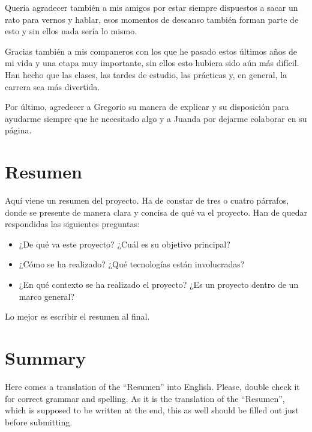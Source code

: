 \documentclass[a4paper, 12pt]{book}
\begin{document}
Quería agradecer también a mis amigos por estar siempre dispuestos a sacar un rato para vernos y hablar, esos momentos de descanso también forman parte de esto y sin ellos nada sería lo mismo.

Gracias también a mis companeros con los que he pasado estos últimos años de mi vida y una etapa muy importante, sin ellos esto hubiera sido aún más difícil. Han hecho que las clases, las tardes de estudio, las prácticas y, en general, la carrera sea más divertida.

Por último, agredecer a Gregorio su manera de explicar y su disposición para ayudarme siempre que he necesitado algo y a Juanda por dejarme colaborar en su página.



\chapter*{Resumen}

Aquí viene un resumen del proyecto.
Ha de constar de tres o cuatro párrafos, donde se presente de manera clara y concisa de qué va el proyecto. 
Han de quedar respondidas las siguientes preguntas:

\begin{itemize}
  \item ¿De qué va este proyecto? ¿Cuál es su objetivo principal?
  \item ¿Cómo se ha realizado? ¿Qué tecnologías están involucradas?
  \item ¿En qué contexto se ha realizado el proyecto? ¿Es un proyecto dentro de un marco general?
\end{itemize}

Lo mejor es escribir el resumen al final.


\chapter*{Summary}

Here comes a translation of the ``Resumen'' into English. 
Please, double check it for correct grammar and spelling.
As it is the translation of the ``Resumen'', which is supposed to be written at the end, this as well should be filled out just before submitting.
\end{document}
